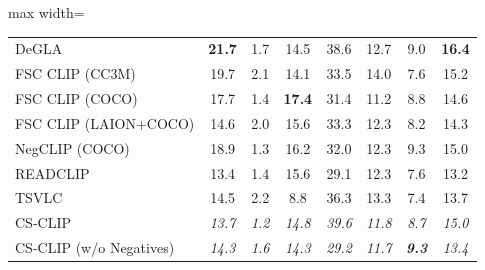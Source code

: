 \begin{table}[t]
\begin{adjustbox}{max width=\textwidth}
\begin{tabular}{p{5cm}c|c|c|c|c|c|c}
    DeGLA & \textbf{21.7} & 1.7 & 14.5 & 38.6 & 12.7 & 9.0 & \textbf{16.4} \\
    FSC CLIP (CC3M) & 19.7 & 2.1 & 14.1 & 33.5 & 14.0 & 7.6 & 15.2 \\
    FSC CLIP (COCO) & 17.7 & 1.4 & \textbf{17.4} & 31.4 & 11.2 & 8.8 & 14.6 \\
    FSC CLIP (LAION+COCO) & 14.6 & 2.0 & 15.6 & 33.3 & 12.3 & 8.2 & 14.3 \\
    NegCLIP (COCO) & 18.9 & 1.3 & 16.2 & 32.0 & 12.3 & 9.3 & 15.0 \\
    READCLIP & 13.4 & 1.4 & 15.6 & 29.1 & 12.3 & 7.6 & 13.2 \\
    TSVLC & 14.5 & 2.2 & 8.8 & 36.3 & 13.3 & 7.4 & 13.7 \\
    \midrule
    CS-CLIP & \emph{13.7} & \emph{1.2} & \emph{14.8} & \emph{39.6} & \emph{11.8} & \emph{8.7} & \emph{15.0} \\
    CS-CLIP (w/o Negatives) & \emph{14.3} & \emph{1.6} & \emph{14.3} & \emph{29.2} & \emph{11.7} & \emph{\textbf{9.3}} & \emph{13.4} \\
    \bottomrule
  \end{tabular}
  \end{adjustbox}
\end{table}

